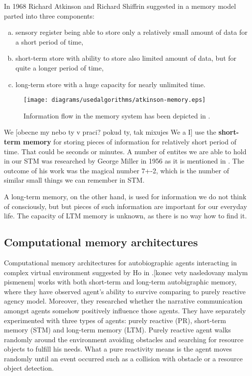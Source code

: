 In 1968 Richard Atkinson and Richard Shiffrin suggested in \cite{Atkinson:humanmemory} a memory model parted into three components: 

\begin{enumerate}[(a)]
\item sensory register being able to store only a relatively small amount of data for a short period of time,
\item short-term store with ability to store also limited amount of data, but for quite a longer period of time,
\item long-term store with a huge capacity for nearly unlimited time.
\end{enumerate}

\begin{figure}
  \centering                                
  \texttt{[image: diagrams/usedalgorithms/atkinson-memory.eps]}    
  \caption{Information flow in the memory system has been depicted in \cite{Atkinson:controlofrtm}.}
  \label{usedalgorithms:qttv}
\end{figure}

We [obecne my nebo ty v praci? pokud ty, tak mixujes We a I] use the {\bf short-term memory} for storing pieces of information for relatively short period of time. That could be seconds or minutes. A number of entites we are able to hold in our STM was researched by George Miller in 1956 as it is mentioned in \cite{Sternberg:congitivepsychology}. The outcome of his work was the magical number 7+-2, which is the number of similar small things we can remember in STM.

A long-term memory, on the other hand, is used for information we do not think of consciously, but but pieces of such information are important for our everyday life. The capacity of LTM memory is unknown, as there is no way how to find it. 
                                               
\subsection{Computational memory architectures}

Computational memory architectures for autobiographic agents interacting in complex virtual environment suggested by Ho in \cite{Ho:memoryarchitectures}.[konec vety nasledovany malym pismenem] works with both short-term and long-term autobigraphic memory, where they have observed agent’s ability to survive comparing to purely reactive agency model. Moreover, they researched whether the narrative communication amongst agents somehow positively influence those agents. They have separately experimented with three types of agents: purely reactive (PR), short-term memory (STM) and long-term memory (LTM). Purely reactive agent walks randomly around the environment avoiding obstacles and searching for resource objects to fulfill his needs. What a pure reactivity means is the agent moves randomly until an event occurred such as a collision with obstacle or a resource object detection.

